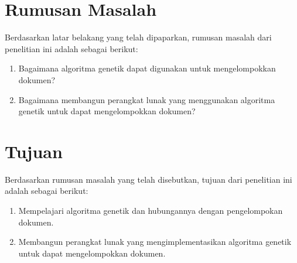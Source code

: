 \documentclass[a4paper,twoside]{article}
\begin{document}
\section{Rumusan Masalah}
Berdasarkan latar belakang yang telah dipaparkan, rumusan masalah dari penelitian ini adalah sebagai berikut:

\begin{enumerate}
 \item Bagaimana algoritma genetik dapat digunakan untuk mengelompokkan dokumen?
 \item Bagaimana membangun perangkat lunak yang menggunakan algoritma genetik untuk dapat mengelompokkan
dokumen?
\end{enumerate}

\section{Tujuan}
Berdasarkan rumusan masalah yang telah disebutkan, tujuan dari penelitian ini adalah sebagai berikut:

\begin{enumerate}
	\item Mempelajari algoritma genetik dan hubungannya dengan pengelompokan dokumen.
	\item Membangun perangkat lunak yang mengimplementasikan algoritma genetik untuk dapat mengelompokkan
dokumen.
\end{enumerate}
\end{document}
